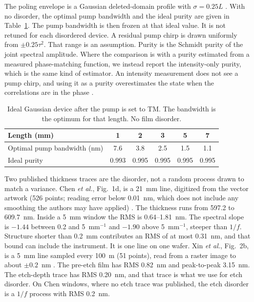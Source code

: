 \documentclass[11pt,a4paper]{article}
\begin{document}
The poling envelope is a Gaussian deleted-domain profile with $\sigma=0.25L$ \cite{Tambasco2016}.
With no disorder, the optimal pump bandwidth and the ideal purity are given in Table~\ref{tab:ideal}.
The pump bandwidth is then frozen at that ideal value.
It is not retuned for each disordered device.
A residual pump chirp is drawn uniformly from $\pm 0.25\tau^{2}$.
That range is an assumption.
Purity is the Schmidt purity of the joint spectral amplitude.
Where the comparison is with a purity estimated from a measured phase-matching function, we instead report the intensity-only purity, which is the same kind of estimator.
An intensity measurement does not see a pump chirp, and using it as a purity overestimates the state when the correlations are in the phase \cite{Graffitti2018}.

\begin{table}[t]
\centering
\caption{Ideal Gaussian device after the pump is set to TM.
The bandwidth is the optimum for that length.
No film disorder.}
\label{tab:ideal}
\begin{tabular}{lccccc}
\toprule
Length (mm) & 1 & 2 & 3 & 5 & 7 \\
\midrule
Optimal pump bandwidth (nm) & 7.6 & 3.8 & 2.5 & 1.5 & 1.1 \\
Ideal purity & 0.993 & 0.995 & 0.995 & 0.995 & 0.995 \\
\bottomrule
\end{tabular}
\end{table}

Two published thickness traces are the disorder, not a random process drawn to match a variance.
Chen \emph{et al.}, Fig.~1d, is a 21~mm line, digitized from the vector artwork (526 points; reading error below 0.01~nm, which does not include any smoothing the authors may have applied) \cite{Chen2024}.
The thickness runs from 597.2 to 609.7~nm.
Inside a 5~mm window the RMS is 0.64--1.81~nm.
The spectral slope is $-1.44$ between 0.2 and 5~mm$^{-1}$ and $-1.90$ above 5~mm$^{-1}$, steeper than $1/f$.
Structure shorter than 0.2~mm contributes an RMS of at most 0.31~nm, and that bound can include the instrument.
It is one line on one wafer.
Xin \emph{et al.}, Fig.~2b, is a 5~mm line sampled every 100~\textmu m (51 points), read from a raster image to about $\pm 0.2$~nm \cite{Xin2025}.
The pre-etch film has RMS 0.82~nm and peak-to-peak 3.15~nm.
The etch-depth trace has RMS 0.20~nm, and that trace is what we use for etch disorder.
On Chen windows, where no etch trace was published, the etch disorder is a $1/f$ process with RMS 0.2~nm.
\end{document}
